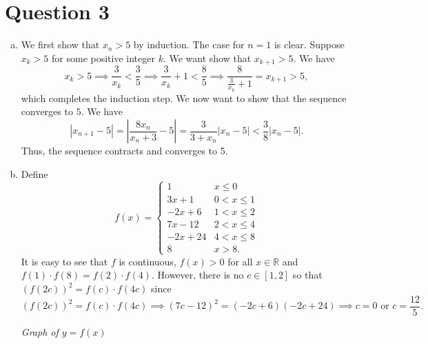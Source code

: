 \documentclass{article}
\begin{document}
\section*{Question 3}
\begin{enumerate}[(a)]
    \item We first show that $x_n>5$ by induction. The case for $n=1$ is clear. Suppose $x_k>5$ for some positive integer $k.$ We want show that $x_{k+1}>5.$ We have $$x_k>5\implies \frac{3}{x_k}<\frac{3}{5}\implies \frac{3}{x_k}+1<\frac{8}{5}\implies\frac{8}{\frac{3}{x_k}+1}=x_{k+1}>5,$$ which completes the induction step. We now want to show that the sequence converges to $5.$ We have $$|x_{n+1}-5|=\left|\frac{8x_n}{x_n+3}-5\right|=\frac{3}{3+x_n}\left|x_n-5\right|<\frac{3}{8}|x_n-5|.$$ Thus, the sequence contracts and converges to 5.
    \item Define $$f(x)=\begin{cases}
    1&x\leq 0\\
    3x+1&0<x\leq1\\
    -2x+6&1<x\leq2\\
    7x-12&2<x\leq4\\
    -2x+24&4<x\leq8\\
    8&x>8.
    \end{cases}$$
    It is easy to see that $f$ is continuous, $f(x)>0$ for all $x\in\mathbb{R}$ and $f(1)\cdot f(8)=f(2)\cdot f(4).$ However, there is no $c\in[1,2]$ so that $(f(2c))^2=f(c)\cdot f(4c)$ since $$(f(2c))^2=f(c)\cdot f(4c)\implies (7c-12)^2=(-2c+6)(-2c+24)\implies c=0\text{ or }c=\frac{12}{5}.$$
    
\begin{center}
    \textit{Graph of $y=f(x)$}
\end{center}
\end{enumerate}
\end{document}
